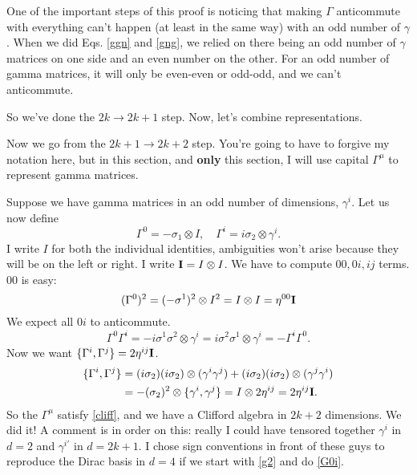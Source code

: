 \documentclass[main.tex]{subfiles}
\begin{document}
One of the important steps of this proof is noticing that making $\Gamma$ anticommute with everything can't happen (at least in the same way) with an odd number of $\gamma$. When we did Eqs. \ref{ggn} and \ref{gng}, we relied on there being an odd number of $\gamma$ matrices on one side and an even number on the other. For an odd number of gamma matrices, it will only be even-even or odd-odd, and we can't anticommute.

So we've done the $2k\to 2k+1$ step. Now, let's combine representations.

Now we go from the $2k+1 \to 2k+2$ step. You're going to have to forgive my notation here, but in this section, and \textbf{only} this section, I will use capital $\Gamma^\mu$ to represent gamma matrices.

Suppose we have gamma matrices in an odd number of dimensions, $\gamma^i$. Let us now define
\begin{equation} \label{G0i}
\Gamma^0 = -\sigma_1 \otimes I, \quad \Gamma^i = i\sigma_2 \otimes \gamma^i.
\end{equation}
I write $I$ for both the individual identities, ambiguities won't arise because they will be on the left or right. I write $\mathbf{I} = I\otimes I$. We have to compute $00,0i,ij$ terms. $00$ is easy:
\[
(\Gamma^0)^2 = (-\sigma^1)^2 \otimes I^2 = I \otimes I = \eta^{00} \mathbf{I}
\]
We expect all $0i$ to anticommute. 
\[
\Gamma^0 \Gamma^i = -i\sigma^1 \sigma^2 \otimes \gamma^i = i\sigma^2 \sigma^1 \otimes \gamma^i = -\Gamma^i \Gamma^0.
\]
Now we want $\{\Gamma^i,\Gamma^j\} = 2\eta^{ij} \mathbf{I}$.
\begin{align*}
\{\Gamma^i,\Gamma^j\} &= (i\sigma_2)(i\sigma_2) \otimes (\gamma^i \gamma^j) + (i\sigma_2)(i\sigma_2) \otimes (\gamma^j \gamma^i) \\
& = -(\sigma_2)^2 \otimes \{\gamma^i,\gamma^j\} = I \otimes 2\eta^{ij} = 2\eta^{ij} \mathbf{I}.
\end{align*}
So the $\Gamma^\mu$ satisfy \ref{cliff}, and we have a Clifford algebra in $2k+2$ dimensions. We did it! A comment is in order on this: really I could have tensored together $\gamma^i$ in $d=2$ and $\gamma^{i'}$ in $d = 2k+1$. I chose sign conventions in front of these guys to reproduce the Dirac basis in $d=4$ if we start with \ref{g2} and do \ref{G0i}.
\end{document}

